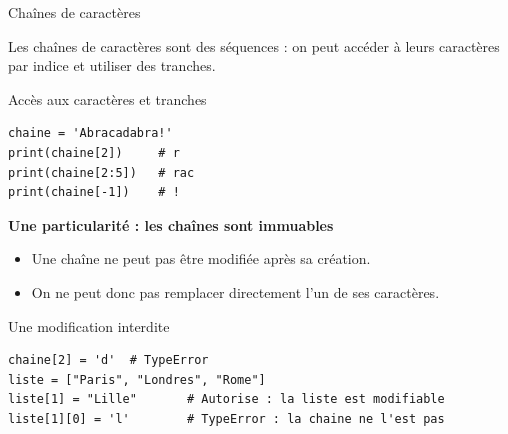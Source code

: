 \documentclass[10pt]{beamer}
\begin{document}
\begin{frame}[fragile]{Chaînes de caractères}

Les chaînes de caractères sont des séquences :
    on peut accéder à leurs caractères par indice et utiliser des tranches.


\begin{exampleblock}{Accès aux caractères et tranches}
\small
\begin{lstlisting}
chaine = 'Abracadabra!'
print(chaine[2])     # r
print(chaine[2:5])   # rac
print(chaine[-1])    # !
\end{lstlisting}
\end{exampleblock}

\textbf{Une particularité : les chaînes sont immuables}
\begin{itemize}
    \item Une chaîne ne peut pas être modifiée après sa création.
    \item On ne peut donc pas remplacer directement l'un de ses caractères.
\end{itemize}


\begin{exampleblock}{Une modification interdite}
\small
\begin{lstlisting}
chaine[2] = 'd'  # TypeError
liste = ["Paris", "Londres", "Rome"]
liste[1] = "Lille"       # Autorise : la liste est modifiable
liste[1][0] = 'l'        # TypeError : la chaine ne l'est pas
\end{lstlisting}
\end{exampleblock}

\end{frame}
\end{document}
